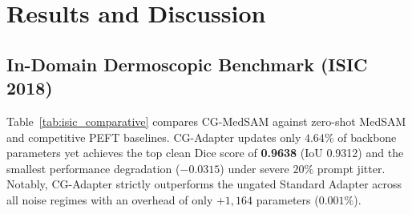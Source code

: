 \documentclass[runningheads]{llncs}
\begin{document}
\section{Results and Discussion}

\subsection{In-Domain Dermoscopic Benchmark (ISIC 2018)}
Table~\ref{tab:isic_comparative} compares CG-MedSAM against zero-shot MedSAM and competitive PEFT baselines. CG-Adapter updates only $4.64\%$ of backbone parameters yet achieves the top clean Dice score of \textbf{0.9638} (IoU 0.9312) and the smallest performance degradation ($-0.0315$) under severe $20\%$ prompt jitter. Notably, CG-Adapter strictly outperforms the ungated Standard Adapter across all noise regimes with an overhead of only $+1,164$ parameters ($0.001\%$).

\begin{table}[t]
\centering
\caption{In-domain comparative PEFT benchmark on ISIC 2018 validation ($N=519$). Bold denotes best performance across all noise regimes.}
\label{tab:isic_comparative}
\end{table}
\end{document}
